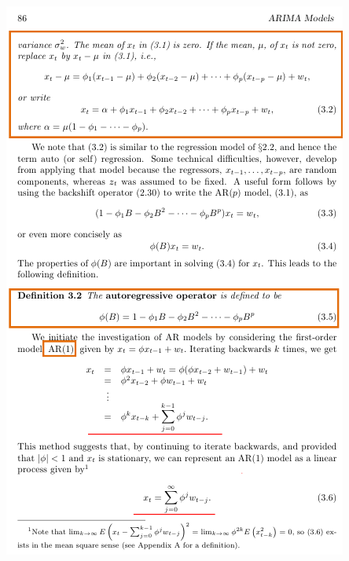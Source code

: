 \documentclass{article}
\begin{document}
\newpage\includegraphics[width=.9\textwidth]{shumway3}
\end{document}
